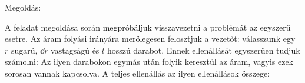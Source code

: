
\ifdefined\megoldas
  
 Megoldás: 

 A feladat megoldása során megpróbáljuk visszavezetni a problémát az egyszerű esetre. Az áram folyási irányára merőlegesen felosztjuk a vezetőt: válasszunk egy $r$ sugarú, $\dd r$ vastagságú és $l$ hosszú darabot. Ennek ellenállását egyszerűen tudjuk számolni:
 Az ilyen darabokon egymás után folyik keresztül az áram, vagyis ezek sorosan vannak kapcsolva. A teljes ellenállás az ilyen ellenállások összege:
 
\fi